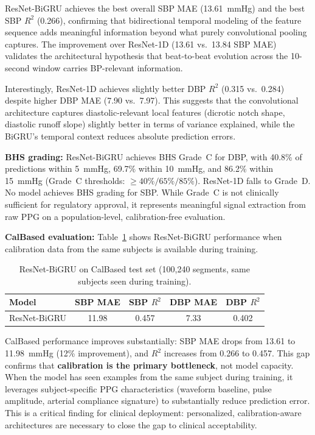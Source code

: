 \documentclass[11pt]{article}
\begin{document}
ResNet-BiGRU achieves the best overall SBP MAE (13.61~mmHg) and the best SBP $R^2$ (0.266), confirming that bidirectional temporal modeling of the feature sequence adds meaningful information beyond what purely convolutional pooling captures. The improvement over ResNet-1D (13.61 vs.\ 13.84 SBP MAE) validates the architectural hypothesis that beat-to-beat evolution across the 10-second window carries BP-relevant information.

Interestingly, ResNet-1D achieves slightly better DBP $R^2$ (0.315 vs.\ 0.284) despite higher DBP MAE (7.90 vs.\ 7.97). This suggests that the convolutional architecture captures diastolic-relevant local features (dicrotic notch shape, diastolic runoff slope) slightly better in terms of variance explained, while the BiGRU's temporal context reduces absolute prediction errors.

\textbf{BHS grading:} ResNet-BiGRU achieves BHS Grade~C for DBP, with 40.8\% of predictions within 5~mmHg, 69.7\% within 10~mmHg, and 86.2\% within 15~mmHg (Grade~C thresholds: $\geq 40\%/65\%/85\%$). ResNet-1D falls to Grade~D. No model achieves BHS grading for SBP. While Grade~C is not clinically sufficient for regulatory approval, it represents meaningful signal extraction from raw PPG on a population-level, calibration-free evaluation.

\textbf{CalBased evaluation:} Table~\ref{tab:dl_calbased} shows ResNet-BiGRU performance when calibration data from the same subjects is available during training.

\begin{table}[ht!]
\centering
\begin{tabular}{@{}lcccc@{}}
\toprule
\textbf{Model} & \textbf{SBP MAE} & \textbf{SBP $R^2$} & \textbf{DBP MAE} & \textbf{DBP $R^2$} \\
\midrule
ResNet-BiGRU & 11.98 & 0.457 & 7.33 & 0.402 \\
\bottomrule
\end{tabular}
\caption{ResNet-BiGRU on CalBased test set (100,240 segments, same subjects seen during training).}
\label{tab:dl_calbased}
\end{table}

CalBased performance improves substantially: SBP MAE drops from 13.61 to 11.98~mmHg (12\% improvement), and $R^2$ increases from 0.266 to 0.457. This gap confirms that \textbf{calibration is the primary bottleneck}, not model capacity. When the model has seen examples from the same subject during training, it leverages subject-specific PPG characteristics (waveform baseline, pulse amplitude, arterial compliance signature) to substantially reduce prediction error. This is a critical finding for clinical deployment: personalized, calibration-aware architectures are necessary to close the gap to clinical acceptability.
\end{document}
